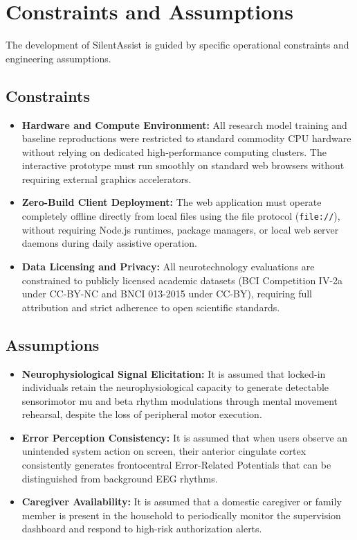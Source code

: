 \documentclass[12pt,a4paper]{report}
\begin{document}
\section{Constraints and Assumptions}
The development of SilentAssist is guided by specific operational constraints and engineering assumptions.

\subsection{Constraints}
\begin{itemize}[leftmargin=1.5em]
    \item \textbf{Hardware and Compute Environment:} All research model training and baseline reproductions were restricted to standard commodity CPU hardware without relying on dedicated high-performance computing clusters. The interactive prototype must run smoothly on standard web browsers without requiring external graphics accelerators.
    \item \textbf{Zero-Build Client Deployment:} The web application must operate completely offline directly from local files using the file protocol (\texttt{file://}), without requiring Node.js runtimes, package managers, or local web server daemons during daily assistive operation.
    \item \textbf{Data Licensing and Privacy:} All neurotechnology evaluations are constrained to publicly licensed academic datasets (BCI Competition IV-2a under CC-BY-NC and BNCI 013-2015 under CC-BY), requiring full attribution and strict adherence to open scientific standards.
\end{itemize}

\subsection{Assumptions}
\begin{itemize}[leftmargin=1.5em]
    \item \textbf{Neurophysiological Signal Elicitation:} It is assumed that locked-in individuals retain the neurophysiological capacity to generate detectable sensorimotor mu and beta rhythm modulations through mental movement rehearsal, despite the loss of peripheral motor execution.
    \item \textbf{Error Perception Consistency:} It is assumed that when users observe an unintended system action on screen, their anterior cingulate cortex consistently generates frontocentral Error-Related Potentials that can be distinguished from background EEG rhythms.
    \item \textbf{Caregiver Availability:} It is assumed that a domestic caregiver or family member is present in the household to periodically monitor the supervision dashboard and respond to high-risk authorization alerts.
\end{itemize}
\end{document}
